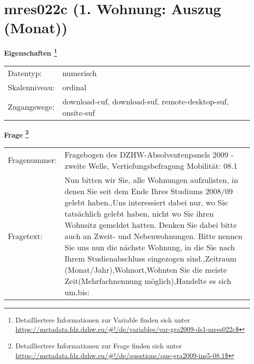 
    \setcounter{footnote}{0}

    \vspace*{-1.8cm}
	\section{mres022c (1. Wohnung: Auszug (Monat))}
	\label{section:mres022c}



    \vspace*{0.5cm}
    \noindent\textbf{Eigenschaften
	\footnote{Detailliertere Informationen zur Variable finden sich unter
		\url{https://metadata.fdz.dzhw.eu/\#!/de/variables/var-gra2009-ds1-mres022c$}}}\\
	\begin{tabularx}{\hsize}{@{}lX}
	Datentyp: & numerisch \\
	Skalenniveau: & ordinal \\
	Zugangswege: &
	  download-cuf, 
	  download-suf, 
	  remote-desktop-suf, 
	  onsite-suf
 \\
    \end{tabularx}



				\vspace*{0.5cm}
                \noindent\textbf{Frage
	                \footnote{Detailliertere Informationen zur Frage finden sich unter
		              \url{https://metadata.fdz.dzhw.eu/\#!/de/questions/que-gra2009-ins5-08.1$}}}\\
				\begin{tabularx}{\hsize}{@{}lX}
					Fragenummer: &
					  Fragebogen des DZHW-Absolventenpanels 2009 - zweite Welle, Vertiefungsbefragung Mobilität:
					  08.1
 \\
					Fragetext: & Nun bitten wir Sie, alle Wohnungen aufzulisten, in denen Sie seit dem Ende Ihres Studiums 2008/09 gelebt haben.,Uns interessiert dabei nur, wo Sie tatsächlich gelebt haben, nicht wo Sie ihren Wohnsitz gemeldet hatten. Denken Sie dabei bitte auch an Zweit- und Nebenwohnungen. Bitte nennen Sie uns nun die nächste Wohnung, in die Sie nach Ihrem Studienabschluss eingezogen sind.,Zeitraum (Monat/Jahr),Wohnort,Wohnten Sie die meiste Zeit(Mehrfachnennung möglich),Handelte es sich um,bis: \\
				\end{tabularx}





